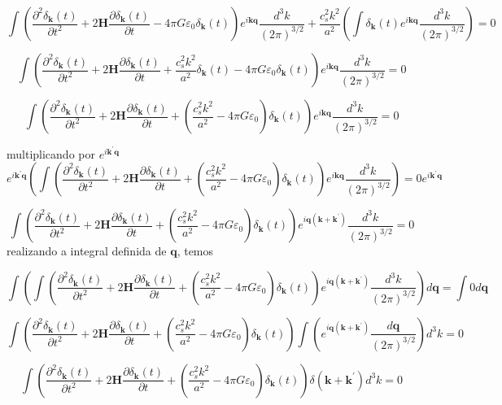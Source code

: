 \documentclass[a4paper,12pt]{article}
\begin{document}
$$\int \left(\dfrac{\partial^2\delta_\mathbf{k}(t)}{\partial t^2}+ 2\mathbf{H}\dfrac{\partial\delta_\mathbf{k}(t)}{\partial t}  - 4\pi G\varepsilon_0\delta_\mathbf{k}(t) \right) e^{i\mathbf{k}\mathbf{q}}\dfrac{d^3k}{(2\pi)^{3/2}} + \dfrac{c^2_sk^2}{a^2}\left(\int \delta_\mathbf{k} (t)e^{i\mathbf{k}\mathbf{q}}\dfrac{d^3k}{(2\pi)^{3/2}}\right)=0 $$

$$\int \left(\dfrac{\partial^2\delta_\mathbf{k}(t)}{\partial t^2}+ 2\mathbf{H}\dfrac{\partial\delta_\mathbf{k}(t)}{\partial t} + \dfrac{c^2_sk^2}{a^2}\delta_\mathbf{k}(t) - 4\pi G\varepsilon_0\delta_\mathbf{k}(t) \right) e^{i\mathbf{k}\mathbf{q}}\dfrac{d^3k}{(2\pi)^{3/2}} =0 $$

$$\int \left(\dfrac{\partial^2\delta_\mathbf{k}(t)}{\partial t^2}+ 2\mathbf{H}\dfrac{\partial\delta_\mathbf{k}(t)}{\partial t} +( \dfrac{c^2_sk^2}{a^2} - 4\pi G\varepsilon_0)\delta_\mathbf{k}(t) \right) e^{i\mathbf{k}\mathbf{q}}\dfrac{d^3k}{(2\pi)^{3/2}} =0 $$

multiplicando por $e^{i\mathbf{k}^\prime\mathbf{q}}$
$$e^{i\mathbf{k}^\prime\mathbf{q}}\left(\int \left(\dfrac{\partial^2\delta_\mathbf{k}(t)}{\partial t^2}+ 2\mathbf{H}\dfrac{\partial\delta_\mathbf{k}(t)}{\partial t} +( \dfrac{c^2_sk^2}{a^2} - 4\pi G\varepsilon_0)\delta_\mathbf{k}(t) \right) e^{i\mathbf{k}\mathbf{q}}\dfrac{d^3k}{(2\pi)^{3/2}}\right) =0e^{i\mathbf{k}^\prime\mathbf{q}} $$

$$\int \left(\dfrac{\partial^2\delta_\mathbf{k}(t)}{\partial t^2}+ 2\mathbf{H}\dfrac{\partial\delta_\mathbf{k}(t)}{\partial t} +( \dfrac{c^2_sk^2}{a^2} - 4\pi G\varepsilon_0)\delta_\mathbf{k}(t) \right) e^{i\mathbf{q}(\mathbf{k}+\mathbf{k}^\prime)}\dfrac{d^3k}{(2\pi)^{3/2}} =0 $$
realizando a integral definida de $\mathbf{q}$, temos

$$\int\left( \int \left(\dfrac{\partial^2\delta_\mathbf{k}(t)}{\partial t^2}+ 2\mathbf{H}\dfrac{\partial\delta_\mathbf{k}(t)}{\partial t} +( \dfrac{c^2_sk^2}{a^2} - 4\pi G\varepsilon_0)\delta_\mathbf{k}(t) \right) e^{i\mathbf{q}(\mathbf{k}+\mathbf{k}^\prime)}\dfrac{d^3k}{(2\pi)^{3/2}} \right)d\mathbf{q} =\int0d\mathbf{q} $$

$$ \int \left(\dfrac{\partial^2\delta_\mathbf{k}(t)}{\partial t^2}+ 2\mathbf{H}\dfrac{\partial\delta_\mathbf{k}(t)}{\partial t} +( \dfrac{c^2_sk^2}{a^2} - 4\pi G\varepsilon_0)\delta_\mathbf{k}(t) \right) \int\left(e^{i\mathbf{q}(\mathbf{k}+\mathbf{k}^\prime)}\dfrac{d\mathbf{q}}{(2\pi)^{3/2}} \right)d^3k =0 $$

$$ \int \left(\dfrac{\partial^2\delta_\mathbf{k}(t)}{\partial t^2}+ 2\mathbf{H}\dfrac{\partial\delta_\mathbf{k}(t)}{\partial t} +( \dfrac{c^2_sk^2}{a^2} - 4\pi G\varepsilon_0)\delta_\mathbf{k}(t) \right) \delta(\mathbf{k}+\mathbf{k}^\prime)d^3k =0 $$
\end{document}
